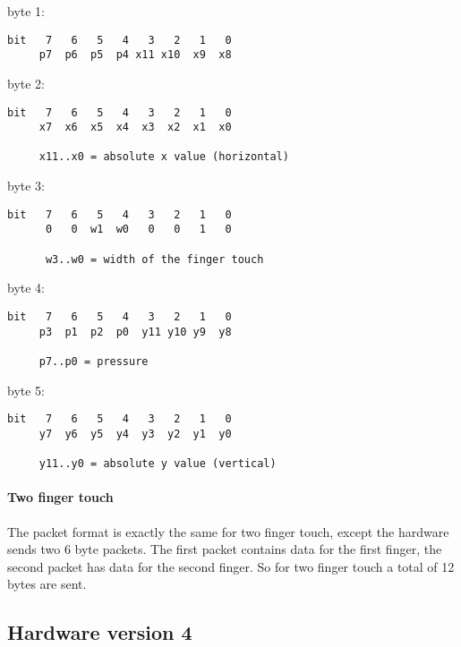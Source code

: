\documentclass[a4paper,8pt,english]{sphinxmanual}
\begin{document}
byte 1:

\begin{Verbatim}[commandchars=\\\{\}]
bit   7   6   5   4   3   2   1   0
     p7  p6  p5  p4 x11 x10  x9  x8
\end{Verbatim}

byte 2:

\begin{Verbatim}[commandchars=\\\{\}]
bit   7   6   5   4   3   2   1   0
     x7  x6  x5  x4  x3  x2  x1  x0

     x11..x0 = absolute x value (horizontal)
\end{Verbatim}

byte 3:

\begin{Verbatim}[commandchars=\\\{\}]
bit   7   6   5   4   3   2   1   0
      0   0  w1  w0   0   0   1   0

      w3..w0 = width of the finger touch
\end{Verbatim}

byte 4:

\begin{Verbatim}[commandchars=\\\{\}]
bit   7   6   5   4   3   2   1   0
     p3  p1  p2  p0  y11 y10 y9  y8

     p7..p0 = pressure
\end{Verbatim}

byte 5:

\begin{Verbatim}[commandchars=\\\{\}]
bit   7   6   5   4   3   2   1   0
     y7  y6  y5  y4  y3  y2  y1  y0

     y11..y0 = absolute y value (vertical)
\end{Verbatim}


\paragraph{Two finger touch}
\label{input/devices/elantech:id5}
The packet format is exactly the same for two finger touch, except the hardware
sends two 6 byte packets. The first packet contains data for the first finger,
the second packet has data for the second finger. So for two finger touch a
total of 12 bytes are sent.


\subsection{Hardware version 4}
\label{input/devices/elantech:hardware-version-4}
\end{document}
